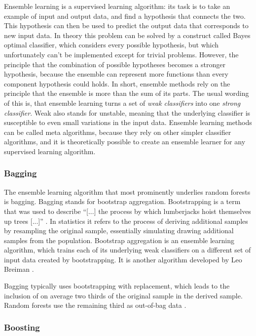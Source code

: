 \documentclass[a4paper,man,12pt,apacite,floatsintext,draftfirst]{apa6} %
\begin{document}
Ensemble learning is a supervised learning algorithm: its task is to take
an example of input and output data, and find a hypothesis that connects
the two.
This hypothesis can then be used to predict the output data that
corresponds to new input data.
In theory this problem can be solved by a construct called
Bayes optimal classifier, which considers every possible hypothesis,
but which unfortunately can't be implemented except for trivial problems.
However, the principle that the combination of possible hypotheses becomes
a stronger hypothesis, because the ensemble can represent more functions
than every component hypothesis could holds.
In short, ensemble methods rely on the principle that the ensemble is more
than the sum of its parts.
The usual wording of this is, that ensemble learning turns a set of
\emph{weak classifiers} into one \emph{strong classifier}.
Weak also stands for unstable, meaning that the underlying classifier is
susceptible to even small variations in the input data.
Ensemble learning methods can be called meta algorithms,
because they rely on other simpler classifier algorithms,
and it is theoretically possible to create an ensemble learner for any
supervised learning algorithm. \cite{wpEL} \cite{Polikar:2009}

\subsubsection{Bagging}

The ensemble learning algorithm that most prominently underlies
random forests is bagging. Bagging stands for bootstrap aggregation.
Bootstrapping is a term that was used to describe
“[...] the process by which lumberjacks hoist themselves up trees [...]”
\cite{wpBOOT}.
In statistics it refers to the process of deriving additional samples
by resampling the original sample,
essentially simulating drawing additional samples from the population.
Bootstrap aggregation is an ensemble learning algorithm,
which trains each of its underlying weak classifiers on a different set
of input data created by bootstrapping.
It is another algorithm developed by Leo Breiman \cite{breiman1996bagging}.

Bagging typically uses bootstrapping with replacement,
which leads to the inclusion of on average two thirds of the original sample
in the derived sample.
Random forests use the remaining third as out-of-bag data
\cite{breiman2001random}.

\subsubsection{Boosting}
\end{document}
